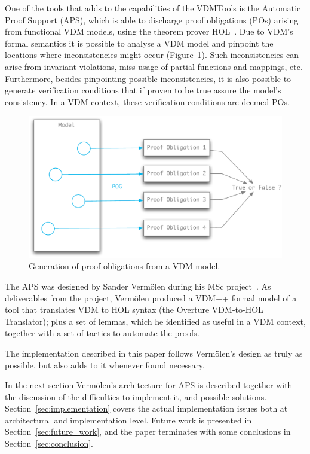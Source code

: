 \documentclass[]{article}
\begin{document}
One of the tools that adds to the capabilities of the VDMTools is the Automatic Proof Support (APS), which is able to discharge proof obligations (POs) arising from functional VDM models, using the theorem prover HOL~\cite{DBLP:conf/tphol/Gordon91}.
Due to VDM's formal semantics it is possible to analyse a VDM model and pinpoint the locations where inconsistencies might occur (Figure~\ref{fig:pog}).
Such inconsistencies can arise from invariant violations, miss usage of partial functions and mappings, etc.
Furthermore, besides pinpointing possible inconsistencies, it is also possible to generate verification conditions that if proven to be true assure the model's consistency.
In a VDM context, these verification conditions are deemed POs.

\begin{figure}
  \begin{center}
    \includegraphics[width=\textwidth]{images/pic_pog.pdf}
    \caption[VDM PO generation]{Generation of proof obligations from a VDM model.}
    \label{fig:pog}
  \end{center}
\end{figure}

The APS was designed by Sander Verm\"olen during his MSc project~\cite{SanderThesis}.
As deliverables from the project, Verm\"olen produced a VDM++ formal model of a tool that translates VDM to HOL syntax (the Overture VDM-to-HOL Translator); plus a set of lemmas, which he identified as useful in a VDM context, together with a set of tactics to automate the proofs.

The implementation described in this paper follows Verm\"olen's design as truly as possible, but also adds to it whenever found necessary.

In the next section Verm\"olen's architecture for APS is described together with the discussion of the difficulties to implement it, and possible solutions.
Section~\ref{sec:implementation} covers the actual implementation issues both at architectural and implementation level.
Future work is presented in Section~\ref{sec:future_work}, and the paper terminates with some conclusions in Section~\ref{sec:conclusion}.
\end{document}
